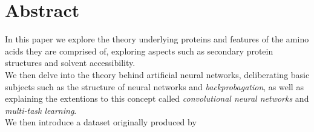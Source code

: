 \section*{Abstract}
In this paper we explore the theory underlying proteins and features of the amino acids they are comprised of, exploring aspects such as secondary protein structures and solvent accessibility.\\
We then delve into the theory behind artificial neural networks, deliberating basic subjects such as the structure of neural networks and \textit{backprobagation}, as well as explaining the extentions to this concept called \textit{convolutional neural networks} and \textit{multi-task learning}.\\
We then introduce a dataset originally produced by 